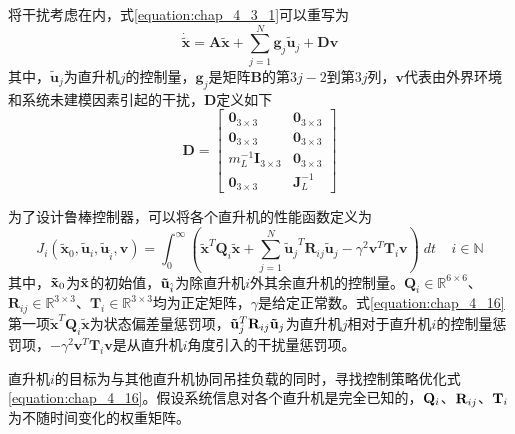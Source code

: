 将干扰考虑在内，式\ref{equation:chap_4_3_1}可以重写为
\begin{equation}
  \dot{\tilde{\mathbf{x}}} = {\mathbf{A\tilde x}} + \sum\limits_{j = 1}^N {{{\mathbf{g}}_j}{{{\mathbf{\tilde u}}}_j}}  + {\mathbf{Dv}}
  \label{equation:chap_4_14}
\end{equation}
其中，$\tilde{\mathbf{u}}_j$为直升机$j$的控制量，$\mathbf{g}_j$是矩阵$\mathbf{B}$的第$3j-2$到第$3j$列，$\mathbf{v}$代表由外界环境和系统未建模因素引起的干扰，$\mathbf{D}$定义如下
\begin{equation}
  {\mathbf{D}} = \left[ {\begin{array}{*{20}{c}}
    {{{\mathbf{0}}_{3 \times 3}}}&{{{\mathbf{0}}_{3 \times 3}}} \\ 
    {{{\mathbf{0}}_{3 \times 3}}}&{{{\mathbf{0}}_{3 \times 3}}} \\ 
    {m_L^{ - 1}{{\mathbf{I}}_{3 \times 3}}}&{{{\mathbf{0}}_{3 \times 3}}} \\ 
    {{{\mathbf{0}}_{3 \times 3}}}&{{\mathbf{J}}_L^{ - 1}} 
  \end{array}} \right]
\end{equation}

为了设计鲁棒控制器，可以将各个直升机的性能函数定义为
\begin{equation}
  {J_i}\left( {{{{\mathbf{\tilde x}}}_0},{{{\mathbf{\tilde u}}}_i},{{{\mathbf{\tilde u}}}_{\hat i}},{\mathbf{v}}} \right) = \int_0^\infty  {\left( {{{{\mathbf{\tilde x}}}^T}{{\mathbf{Q}}_i}{\mathbf{\tilde x}} + \sum\limits_{j = 1}^N {{{{\mathbf{\tilde u}}}_j}^T{{\mathbf{R}}_{ij}}{{{\mathbf{\tilde u}}}_j} - {\gamma ^2}{{\mathbf{v}}^T}{{\mathbf{T}}_i}{\mathbf{v}}} } \right)} \;dt\;\;\;\;i \in \mathbb{N}
  \label{equation:chap_4_16}
\end{equation}
其中，${{\bf{\tilde x}}_0}$为${\bf{\tilde x}}$的初始值，${{\bf{\tilde u}}_{\hat i}}$为除直升机$i$外其余直升机的控制量。${{\mathbf{Q}}_i} \in {\mathbb{R}^{6 \times 6}}$、${{\mathbf{R}}_{ij}} \in {\mathbb{R}^{3 \times 3}}$、${{\mathbf{T}}_i} \in {\mathbb{R}^{3 \times 3}}$均为正定矩阵，$\gamma $是给定正常数。式\ref{equation:chap_4_16}第一项${{\mathbf{\tilde x}}^T}{{\mathbf{Q}}_i}{\mathbf{\tilde x}}$为状态偏差量惩罚项，${{\bf{\tilde u}}_j}^T{{\bf{R}}_{ij}}{{\bf{\tilde u}}_j}$为直升机$j$相对于直升机$i$的控制量惩罚项，$- {\gamma ^2}{{\mathbf{v}}^T}{{\mathbf{T}}_i}{\mathbf{v}}$是从直升机$i$角度引入的干扰量惩罚项。

直升机$i$的目标为与其他直升机协同吊挂负载的同时，寻找控制策略优化式\ref{equation:chap_4_16}。假设系统信息对各个直升机是完全已知的，${{\bf{Q}}_i}$、${{\bf{R}}_{ij}}$、${{\bf{T}}_i}$为不随时间变化的权重矩阵。

